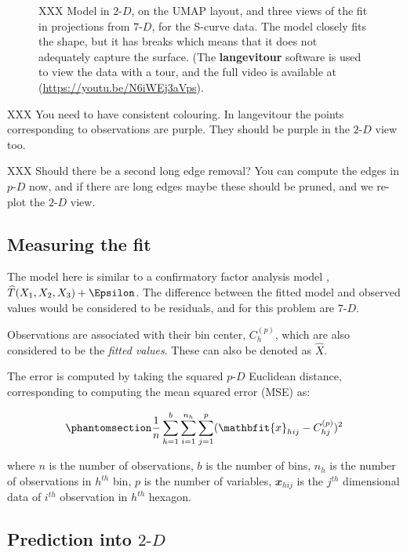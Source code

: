 \documentclass[
  12pt]{article}
\newcommand\pD{$p\text{-}D$}
\newcommand\gD{$2\text{-}D$}
\begin{document}
\begin{figure}[H]
\caption{\label{fig-scurve-sc}XXX Model in \gD{}, on the UMAP layout,
and three views of the fit in projections from \(7\text{-}D\), for the
S-curve data. The model closely fits the shape, but it has breaks which
means that it does not adequately capture the surface. (The
\textbf{langevitour} software is used to view the data with a tour, and
the full video is available at (\url{https://youtu.be/N6iWEj3aVps}).}

\end{figure}%

XXX You need to have consistent colouring. In langevitour the points
corresponding to observations are purple. They should be purple in the
\gD{} view too.

XXX Should there be a second long edge removal? You can compute the
edges in \pD{} now, and if there are long edges maybe these should be
pruned, and we re-plot the \gD{} view.

\subsection{Measuring the fit}\label{sec-summary}

The model here is similar to a confirmatory factor analysis model
\citep{brown2015}, \(\widehat{T}(X_1, X_2, X_3) + \Epsilon\). The
difference between the fitted model and observed values would be
considered to be residuals, and for this problem are \(7\text{-}D\).

Observations are associated with their bin center, \(C_{h}^{(p)}\),
which are also considered to be the \emph{fitted values}. These can also
be denoted as \(\widehat{X}\).

The error is computed by taking the squared \pD{} Euclidean distance,
corresponding to computing the mean squared error (MSE) as:

\begin{equation}\phantomsection\label{eq-equation1}{\frac{1}{n}\sum_{h = 1}^{b}\sum_{i = 1}^{n_h}\sum_{j = 1}^{p} (\mathbfit{x}_{hij} - C^{(p)}_{hj})^2}\end{equation}

where \(n\) is the number of observations, \(b\) is the number of bins,
\(n_h\) is the number of observations in \(h^{th}\) bin, \(p\) is the
number of variables, \(\mathbfit{x}_{hij}\) is the \(j^{th}\)
dimensional data of \(i^{th}\) observation in \(h^{th}\) hexagon.

\subsection{\texorpdfstring{Prediction into
\gD{}}{Prediction into }}\label{prediction-into}
\end{document}

